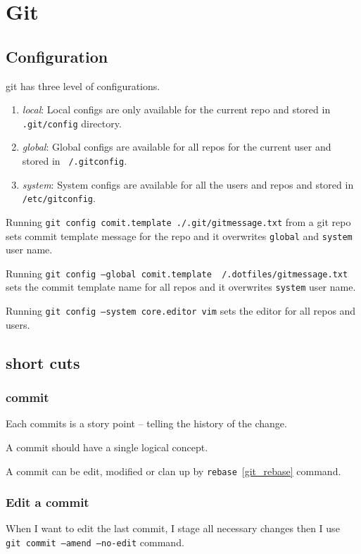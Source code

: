 \chapter{Git}

\section{Configuration}
git has three level of configurations.
\begin{enumerate}
  \item \textit{local}: Local configs are only available for the current repo and stored in \texttt{.git/config} directory.
  \item \textit{global}: Global configs are available for all repos for the current user and stored in \texttt{~/.gitconfig}.
  \item \textit{system}: System configs are available for all the users and repos and stored in \texttt{/etc/gitconfig}.
\end{enumerate}

Running \texttt{git config comit.template ./.git/gitmessage.txt} from a git repo sets commit template message for the repo and it overwrites \texttt{global} and \texttt{system} user name.


Running \texttt{git config --global comit.template ~/.dotfiles/gitmessage.txt} sets the commit template name for all repos and it overwrites \texttt{system} user name.


Running \texttt{git config --system core.editor vim} sets the editor for all repos and users.

\section{short cuts}

\subsection{commit}
Each commits is a story point -- telling the history of the change.

A commit should have a single logical concept.

A commit can be edit, modified or clan up by \texttt{rebase}~\ref{git_rebase} command.

\subsection{Edit a commit}
When I want to edit the last commit, I stage all necessary changes then I use \texttt{ git commit --amend --no-edit} command.


